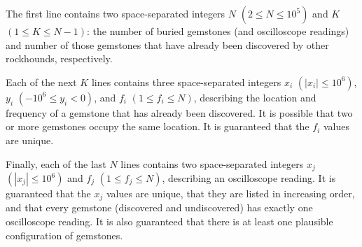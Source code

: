
The first line contains two space-separated integers $N$ $(2 \le N \le 10^5)$ and $K$ $(1 \le K \le N - 1)$: the number of buried gemstones (and oscilloscope readings) and number of those gemstones that have already been discovered by other rockhounds, respectively.

Each of the next $K$ lines contains three space-separated integers $x_i$ $(|x_i| \le 10^6)$, $y_i$ $(-10^6 \le y_i < 0)$, and $f_i$ $(1 \le f_i \le N)$, describing the location and frequency of a gemstone that has already been discovered.  It is possible that two or more gemstones occupy the same location. It is guaranteed that the $f_i$ values are unique.

Finally, each of the last $N$ lines contains two space-separated integers $x_j$ $(|x_j| \le 10^6)$ and $f_j$ $(1 \le f_j \le N)$, describing an oscilloscope reading. It is guaranteed that the $x_j$ values are unique, that they are listed in increasing order, and that every gemstone (discovered and undiscovered) has exactly one oscilloscope reading. It is also guaranteed that there is at least one plausible configuration of gemstones.

